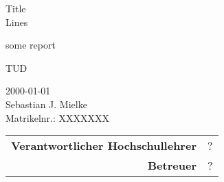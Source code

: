 \documentclass[fontsize=12pt, paper=a4, twoside=false, parskip=half+, pagesize=auto, numbers=noenddot, open=right, toc=listof, toc=bibliography, fleqn]{scrreprt}
\begin{document}
\thispagestyle{empty}

\begin{center}
	\vspace*{5mm}
	{\Huge Title\\[.25\baselineskip]Lines}\\
	\vspace{15mm}
	
	{\Large some report}\\
	
	\vspace{50mm}
	\begin{large}
		TUD\\
	\end{large}
	\vspace{20mm}
	2000-01-01\\
	\vspace{20mm}
	Sebastian J. Mielke \\
	Matrikelnr.: XXXXXXX\\
	\vspace{30mm}
	\begin{tabular}{rl}
		{\bfseries Verantwortlicher Hochschullehrer} & ?\\
		{\bfseries Betreuer} & ?\\
	\end{tabular}
\end{center}

\clearpage
{}

\tableofcontents

\clearpage



\clearpage

\appendix


\clearpage

\printbibliography
\end{document}
